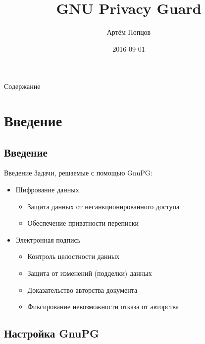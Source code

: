 \documentclass[presentation]{beamer}
\author{Артём Попцов}
\date{2016-09-01}
\title{GNU Privacy Guard}
\begin{document}
\maketitle



\begin{frame}{Содержание}
  \setcounter{tocdepth}{1}
  \tableofcontents
\end{frame}



\section{Введение}

\subsection{Введение}

\begin{frame}{Введение}
  Задачи, решаемые с помощью GnuPG:\newline
  \begin{itemize}
  \item Шифрование данных
    \begin{itemize}
    \item Защита данных от несанкционированного доступа
    \item Обеспечение приватности переписки\newline
    \end{itemize}
  \item Электронная подпись
    \begin{itemize}
    \item Контроль целостности данных
    \item Защита от изменений (подделки) данных
    \item Доказательство авторства документа
    \item Фиксирование невозможности отказа от авторства
    \end{itemize}
  \end{itemize}
\end{frame}



\subsection{Настройка GnuPG}
\end{document}
